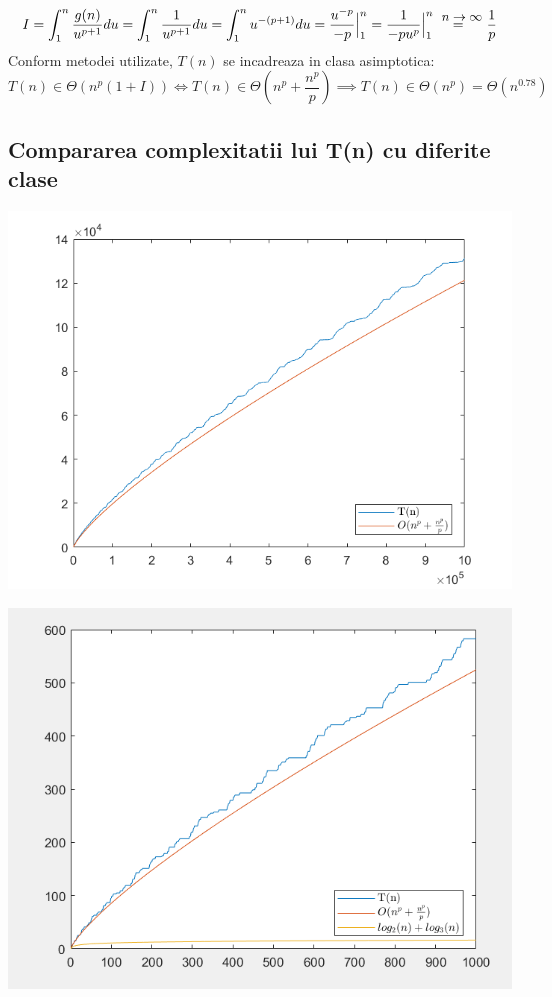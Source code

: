 \documentclass[12pt]{article}
\newcommand\myeq{\stackrel{\mathclap{\normalfont\mbox{\;\;\;\;\small{$n\to\infty$}}}}{\;\;\;\;=\;\;}}
\begin{document}
\begin{equation*}
    I = \int_{1}^{n} {\frac{g(n)}{u^{p+1}} du} = \int_{1}^{n} {\frac{1}{u^{p+1}} du} = \int_{1}^{n} {u^{-(p+1)} du} = \frac{u^{-p}}{-p}\Big|_1^n = \frac{1}{-pu^{p}}\Big|_1^n \myeq \;\;\; \frac{1}{p}
\end{equation*}
Conform metodei utilizate, $T(n)$ se incadreaza in clasa asimptotica:
\begin{equation*}
    T(n) \in \Theta(n^p (1 + I)) \Longleftrightarrow T(n) \in \Theta(n^p + \frac{n^p}{p}) \implies T(n) \in \Theta(n^p) = \Theta(n^{0.78})
\end{equation*}

\newpage
\subsection*{Compararea complexitatii lui T(n) cu diferite clase}
\begin{center}
    \includegraphics[scale=0.72]{compar1.png}
\end{center}
\begin{center}
    \includegraphics[scale=0.6]{compar2.png}
\end{center}
\end{document}
